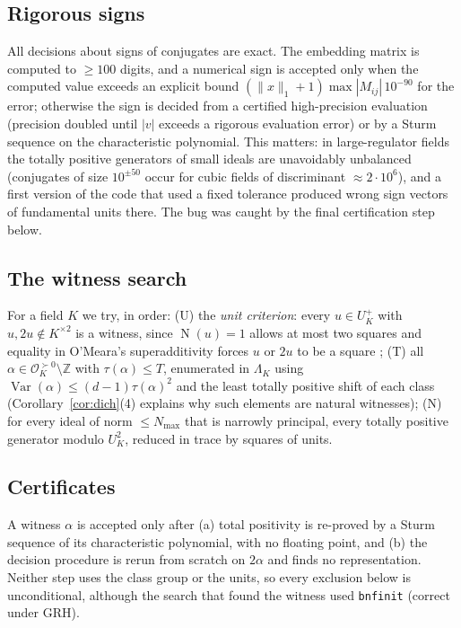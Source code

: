 \documentclass[11pt,reqno]{amsart}
\theoremstyle{plain}
\theoremstyle{definition}
\newcommand{\Z}{\mathbb{Z}}
\newcommand{\OK}{\mathcal{O}_K}
\newcommand{\tp}{\succ 0}
\DeclareMathOperator{\Var}{Var}
\DeclareMathOperator{\Nm}{N}
\begin{document}
\subsection{Rigorous signs}
All decisions about signs of conjugates are exact. The embedding matrix is computed to $\ge100$
digits, and a numerical sign is accepted only when the computed value exceeds an explicit bound
$(\|x\|_1+1)\max|M_{ij}|\,10^{-90}$ for the error; otherwise the sign is decided from a certified
high-precision evaluation (precision doubled until $|v|$ exceeds a rigorous evaluation error) or by a
Sturm sequence on the characteristic polynomial. This matters: in large-regulator fields the
totally positive generators of small ideals are unavoidably unbalanced (conjugates of size
$10^{\pm50}$ occur for cubic fields of discriminant $\approx2\cdot10^{6}$), and a first version of
the code that used a fixed tolerance produced wrong sign vectors of fundamental units there. The
bug was caught by the final certification step below.

\subsection{The witness search}
For a field $K$ we try, in order: (U) the \emph{unit criterion}: every $u\in U_K^{+}$ with
$u,2u\notin K^{\times2}$ is a witness, since $\Nm(u)=1$ allows at most two squares and equality in
O'Meara's superadditivity forces $u$ or $2u$ to be a square \cite[unit dichotomy lemma]{PB}; (T) all
$\alpha\in\OK^{\tp}\setminus\Z$ with $\tau(\alpha)\le T$, enumerated in $\Lambda_K$ using
$\Var(\alpha)\le(d-1)\tau(\alpha)^{2}$ and the least totally positive shift of each class
(Corollary~\ref{cor:dich}(4) explains why such elements are natural witnesses); (N) for every ideal
of norm $\le N_{\max}$ that is narrowly principal, every totally positive generator modulo $U_K^{2}$,
reduced in trace by squares of units.

\subsection{Certificates}
A witness $\alpha$ is accepted only after (a) total positivity is re-proved by a Sturm sequence of
its characteristic polynomial, with no floating point, and (b) the decision procedure is rerun from
scratch on $2\alpha$ and finds no representation. Neither step uses the class group or the units, so
every exclusion below is unconditional, although the search that found the witness used
\texttt{bnfinit} (correct under GRH).
\end{document}
